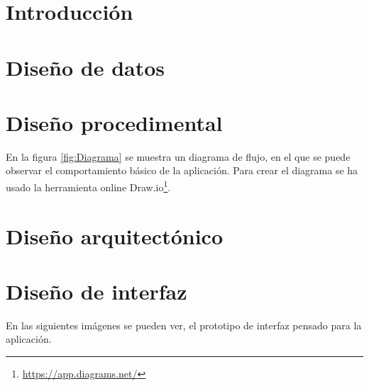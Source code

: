 
\section{Introducción}

\section{Diseño de datos}

\section{Diseño procedimental}
En la figura  \ref{fig:Diagrama} se muestra un diagrama de flujo, en el que se puede observar el comportamiento básico de la aplicación. Para crear el diagrama se ha usado la herramienta online Draw.io\footnote{\url{https://app.diagrams.net/}}.
\section{Diseño arquitectónico}
\section{Diseño de interfaz}

En las siguientes imágenes se pueden ver, el prototipo de interfaz pensado para la aplicación. 